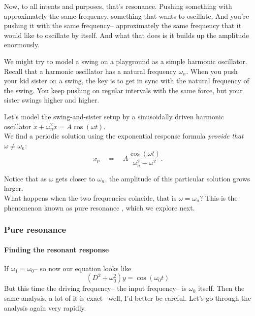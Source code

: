 Now, to all intents and purposes, that's resonance.
Pushing something with approximately the same frequency, something that wants to oscillate.
And you're pushing it with the same frequency-- approximately
the same frequency that it would like to oscillate by itself.
And what that does is it builds up the amplitude enormously.\\

\begin{example}
  We might try to model a swing on a playground as a simple harmonic oscillator.
  Recall that a harmonic oscillator has a natural frequency $\omega _n$.
  When you push your kid sister on a swing,
  the key is to get in sync with the natural frequency of the swing.
  You keep pushing on regular intervals with the same force, but your sister swings higher and higher.
\end{example}

Let's model the swing-and-sister setup by a sinusoidally driven harmonic oscillator
$\ddot{x}+\omega _ n^2x=A\cos (\omega t)$.\\
We find a periodic solution using the exponential response formula
\textit{provide that} $\omega \neq \omega _ n$:
\begin{equation*}
  \displaystyle x_p \quad
  \displaystyle = \quad
  \displaystyle A\frac{\cos (\omega t)}{\omega _ n^2-\omega ^2}.
\end{equation*}

Notice that as $\omega$ gets closer to $\omega_ n$,
the amplitude of this particular solution grows larger.\\

What happens when the two frequencies coincide,
that is $\omega = \omega _n$? This is the phenomenon known as pure resonance , which we explore next.
\clearpage

\subsubsection{Pure resonance}

\paragraph{Finding the resonant response}
If $\omega_ 1 = \omega_ 0$--
so now our equation looks like
\begin{equation*}
  (D^2 + \omega_ 0 ^2)y = \cos (\omega _0 t)
\end{equation*}
But this time the driving frequency--
the input frequency-- is $\omega_ 0$ itself.
Then the same analysis, a lot of it is exact--
well, I'd better be careful.
Let's go through the analysis again very rapidly.

